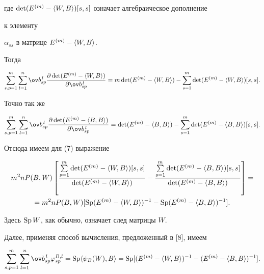 где $\det(E^{(m)}-\langle W,B\rangle)[s,s]$ означает алгебраическое дополнение 


к элементу 


$\alpha_{s{}s}$ в матрице $E^{(m)}-\langle W,B\rangle$. 


Тогда 


$$ 


\sum^m_{s,p=1}\sum^n_{l=1}\ov b^{\,l}_{s p} 


\frac{\partial\det(E^{(m)}-\la W,B\ra)} 


{\partial\ov b^{\,l}_{s p}}=m\det(E^{(m)}-\la W,B\ra)- 


\sum^m_{s=1}\det(E^{(m)}-\la W,B\ra)[s,s]. 


$$ 


Точно так же 


$$ 


\sum^m_{s,p=1}\sum^n_{l=1}\ov b^{\,l}_{s p} 


\frac{\partial\det(E^{(m)}-\la B,B\ra)} 


{\partial\ov b^{\,l}_{s p}}=\det(E^{(m)}-\la B,B\ra)- 


\sum^m_{s=1}\det(E^{(m)}-\la B,B\ra)[s,s]. 


$$ 


Отсюда имеем для (7) выражение 


\begin{multline} 


m^2n P(B,W)\left[ 


\frac{\sum\limits^m_{s=1}\det(E^{(m)}-\la W,B\ra)[s,s]} 


{\det(E^{(m)}-\la W,B\ra)}- 


\frac{\sum\limits^m_{s=1}\det(E^{(m)}-\la B,B\ra)[s,s]} 


{\det(E^{(m)}-\la B,B\ra)}\right]= \\ 


% 


=m^2n P(B,W)[\sP(E^{(m)}-\la W,B\ra)^{-1}- 


\sP(E^{(m)}-\la B,B\ra)^{-1}]. 


\end{multline} 


Здесь $\operatorname{Sp} W$, как обычно, означает след матрицы $W$. 


 


Далее, применяя способ вычисления, предложенный в [8], имеем 


\begin{equation} 


\sum^m_{s,p=1}\sum^n_{l=1}\ov b^{\,l}_{s p} 


\varphi^{B,l}_{s p}=\sP\la\psi_B(W),B\ra= 


\sP[(E^{(m)}-\la W,B\ra)^{-1}- 


(E^{(m)}-\la B,B\ra)^{-1}]. 


\end{equation} 


